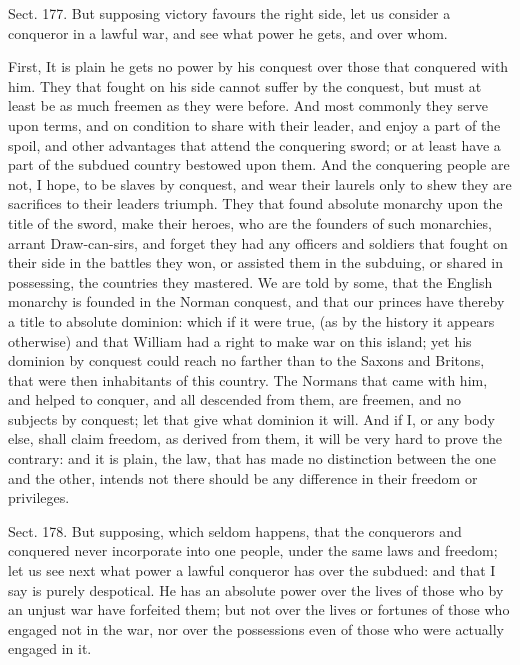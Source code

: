 \documentclass[11pt,openany]{book}
\begin{document}
Sect. 177. But supposing victory favours the right side, let us consider a conqueror in a lawful war, and see what power he gets, and over whom.

First, It is plain he gets no power by his conquest over those that conquered with him. They that fought on his side cannot suffer by the conquest, but must at least be as much freemen as they were before. And most commonly they serve upon terms, and on condition to share with their leader, and enjoy a part of the spoil, and other advantages that attend the conquering sword; or at least have a part of the subdued country bestowed upon them. And the conquering people are not, I hope, to be slaves by conquest, and wear their laurels only to shew they are sacrifices to their leaders triumph. They that found absolute monarchy upon the title of the sword, make their heroes, who are the founders of such monarchies, arrant Draw-can-sirs, and forget they had any officers and soldiers that fought on their side in the battles they won, or assisted them in the subduing, or shared in possessing, the countries they mastered. We are told by some, that the English monarchy is founded in the Norman conquest, and that our princes have thereby a title to absolute dominion: which if it were true, (as by the history it appears otherwise) and that William had a right to make war on this island; yet his dominion by conquest could reach no farther than to the Saxons and Britons, that were then inhabitants of this country. The Normans that came with him, and helped to conquer, and all descended from them, are freemen, and no subjects by conquest; let that give what dominion it will. And if I, or any body else, shall claim freedom, as derived from them, it will be very hard to prove the contrary: and it is plain, the law, that has made no distinction between the one and the other, intends not there should be any difference in their freedom or privileges.

Sect. 178. But supposing, which seldom happens, that the conquerors and conquered never incorporate into one people, under the same laws and freedom; let us see next what power a lawful conqueror has over the subdued: and that I say is purely despotical. He has an absolute power over the lives of those who by an unjust war have forfeited them; but not over the lives or fortunes of those who engaged not in the war, nor over the possessions even of those who were actually engaged in it.
\end{document}
